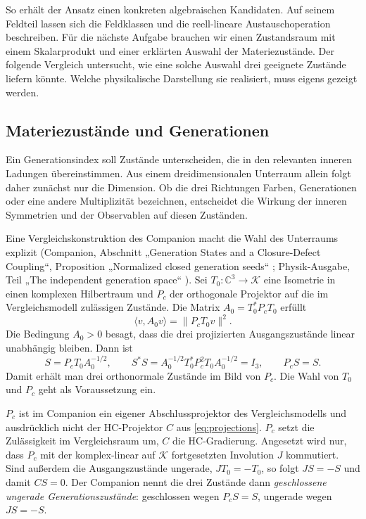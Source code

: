 So erhält der Ansatz einen konkreten algebraischen Kandidaten. Auf seinem Feldteil lassen sich die Feldklassen und die reell-lineare Austauschoperation beschreiben. Für die nächste Aufgabe brauchen wir einen Zustandsraum mit einem Skalarprodukt und einer erklärten Auswahl der Materiezustände. Der folgende Vergleich untersucht, wie eine solche Auswahl drei geeignete Zustände liefern könnte. Welche physikalische Darstellung sie realisiert, muss eigens gezeigt werden.

\subsection{Materiezustände und Generationen}
\label{sec:matter}

Ein Generationsindex soll Zustände unterscheiden, die in den relevanten inneren Ladungen übereinstimmen. Aus einem dreidimensionalen Unterraum allein folgt daher zunächst nur die Dimension. Ob die drei Richtungen Farben, Generationen oder eine andere Multiplizität bezeichnen, entscheidet die Wirkung der inneren Symmetrien und der Observablen auf diesen Zuständen.

Eine Vergleichskonstruktion des Companion macht die Wahl des Unterraums explizit (Companion, Abschnitt „Generation States and a Closure-Defect Coupling“, Proposition „Normalized closed generation seeds“ \cite{companion}; Physik-Ausgabe, Teil „The independent generation space“ \cite{physics}). Sei \(T_0:\mathbb C^3\to\mathcal K\) eine Isometrie in einen komplexen Hilbertraum und \(P_c\) der orthogonale Projektor auf die im Vergleichsmodell zulässigen Zustände. Die Matrix \(A_0=T_0^*P_cT_0\) erfüllt
\[
 \langle v,A_0v\rangle=\|P_cT_0v\|^2 .
\]
Die Bedingung \(A_0>0\) besagt, dass die drei projizierten Ausgangszustände linear unabhängig bleiben. Dann ist
\begin{equation}
 S=P_cT_0A_0^{-1/2}, \qquad
 S^*S=A_0^{-1/2}T_0^*P_c^2T_0A_0^{-1/2}=I_3,\qquad P_cS=S .
 \label{eq:seed}
\end{equation}
Damit erhält man drei orthonormale Zustände im Bild von \(P_c\). Die Wahl von \(T_0\) und \(P_c\) geht als Voraussetzung ein.

\(P_c\) ist im Companion ein eigener Abschlussprojektor des Vergleichsmodells und ausdrücklich nicht der HC-Projektor \(C\) aus \eqref{eq:projections}. \(P_c\) setzt die Zulässigkeit im Vergleichsraum um, \(C\) die HC-Gradierung. Angesetzt wird nur, dass \(P_c\) mit der komplex-linear auf \(\mathcal K\) fortgesetzten Involution \(J\) kommutiert. Sind außerdem die Ausgangszustände ungerade, \(JT_0=-T_0\), so folgt \(JS=-S\) und damit \(CS=0\). Der Companion nennt die drei Zustände dann \emph{geschlossene ungerade Generationszustände}: geschlossen wegen \(P_cS=S\), ungerade wegen \(JS=-S\).

